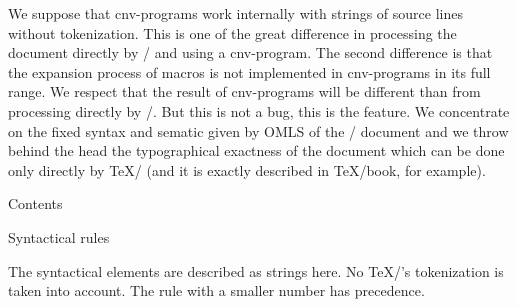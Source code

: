 We suppose that cnv-programs work internally with strings of source lines
without tokenization. This is one of the great difference in processing the
document directly by \OpTeX/ and using a cnv-program. The second difference is
that the expansion process of macros is not implemented in cnv-programs in
its full range. We respect that the result of cnv-programs will be different
than from processing directly by \OpTeX/. But this is not a bug, this is
the feature. We concentrate on the fixed syntax and sematic given by OMLS of the
\OpTeX/ document and we throw behind the head the typographical
exactness of the document which can be done only directly by \TeX/ (and it is
exactly described in \TeX/book, for example).

\notoc\nonum\sec Contents

\maketoc
\vfil\break

\sec Syntactical rules

The syntactical elements are described as strings here. No \TeX/'s tokenization is
taken into account. The rule with a smaller number has precedence.

